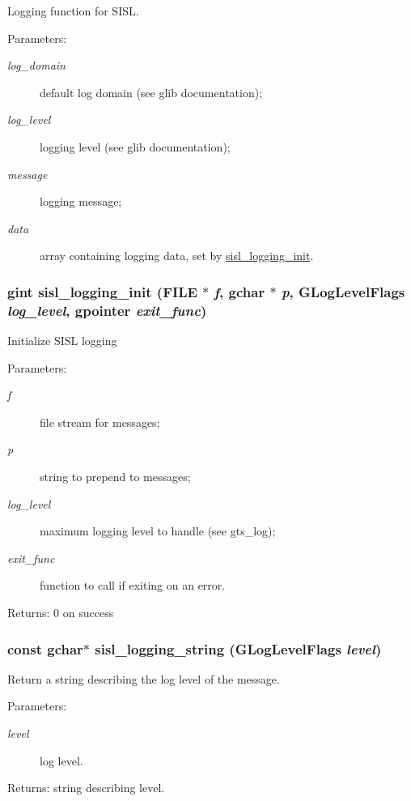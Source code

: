 Logging function for SISL.

\begin{Desc}
\item[Parameters:]
\begin{description}
\item[{\em log\_\-domain}]default log domain (see glib documentation); \item[{\em log\_\-level}]logging level (see glib documentation); \item[{\em message}]logging message; \item[{\em data}]array containing logging data, set by \hyperlink{sisl-logging_8c_a2}{sisl\_\-logging\_\-init}. \end{description}
\end{Desc}
\hypertarget{sisl-logging_8c_a2}{
\subsubsection[sisl\_\-logging\_\-init]{\setlength{\rightskip}{0pt plus 5cm}gint sisl\_\-logging\_\-init (FILE $\ast$ {\em f}, gchar $\ast$ {\em p}, GLog\-Level\-Flags {\em log\_\-level}, gpointer {\em exit\_\-func})}}
\label{sisl-logging_8c_a2}


Initialize SISL logging

\begin{Desc}
\item[Parameters:]
\begin{description}
\item[{\em f}]file stream for messages; \item[{\em p}]string to prepend to messages; \item[{\em log\_\-level}]maximum logging level to handle (see gts\_\-log); \item[{\em exit\_\-func}]function to call if exiting on an error.\end{description}
\end{Desc}
\begin{Desc}
\item[Returns:]0 on success \end{Desc}
\hypertarget{sisl-logging_8c_a0}{
\subsubsection[sisl\_\-logging\_\-string]{\setlength{\rightskip}{0pt plus 5cm}const gchar$\ast$ sisl\_\-logging\_\-string (GLog\-Level\-Flags {\em level})}}
\label{sisl-logging_8c_a0}


Return a string describing the log level of the message.

\begin{Desc}
\item[Parameters:]
\begin{description}
\item[{\em level}]log level.\end{description}
\end{Desc}
\begin{Desc}
\item[Returns:]string describing level. \end{Desc}
